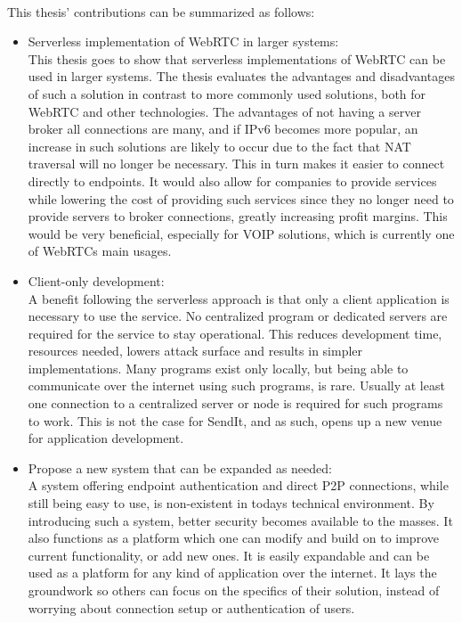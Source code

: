 \paragraph{}
This thesis' contributions can be summarized as follows:
%
\begin{itemize}
	\item Serverless implementation of WebRTC in larger systems:\\
	This thesis goes to show that serverless implementations of WebRTC can be used in larger systems. The thesis evaluates the advantages and disadvantages of such a solution in contrast to more commonly used solutions, both for WebRTC and other technologies. The advantages of not having a server broker all connections are many, and if IPv6 becomes more popular, an increase in such solutions are likely to occur due to the fact that NAT traversal will no longer be necessary. This in turn makes it easier to connect directly to endpoints. It would also allow for companies to provide services while lowering the cost of providing such services since they no longer need to provide servers to broker connections, greatly increasing profit margins. This would be very beneficial, especially for VOIP solutions, which is currently one of WebRTCs main usages.
	\item Client-only development:\\
	A benefit following the serverless approach is that only a client application is necessary to use the service. No centralized program or dedicated servers are required for the service to stay operational. This reduces development time, resources needed, lowers attack surface and results in simpler implementations. Many programs exist only locally, but being able to communicate over the internet using such programs, is rare. Usually at least one connection to a centralized server or node is required for such programs to work. This is not the case for SendIt, and as such, opens up a new venue for application development.
	\item Propose a new system that can be expanded as needed:\\
	A system offering endpoint authentication and direct P2P connections, while still being easy to use, is non-existent in todays technical environment. By introducing such a system, better security becomes available to the masses. It also functions as a platform which one can modify and build on to improve current functionality, or add new ones. It is easily expandable and can be used as a platform for any kind of application over the internet. It lays the groundwork so others can focus on the specifics of their solution, instead of worrying about connection setup or authentication of users.

\end{itemize}

